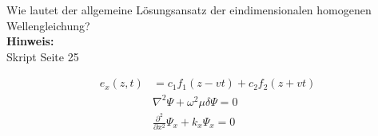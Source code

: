 \begin{question}[section=3,name={Eindimenstionale homogene Wellengleichung},difficulty=,quantity=3,type=thr,tags={20130625,20060816}]
	Wie lautet der allgemeine Lösungsansatz der eindimensionalen homogenen Wellengleichung?
	\\ \textbf{Hinweis:}\\
	Skript Seite 25
\end{question}
\begin{solution}
	\begin{align}
	e_x(z,t) &= c_1 f_1(z-v t) + c_2 f_2 (z+v t)\\
	 &\nabla^2\Psi+\omega^2\mu\delta\Psi=0  \\
	  &\frac{\partial^2}{\partial x^2}\Psi_x+k_x\Psi_x=0
	\end{align}
\end{solution}
